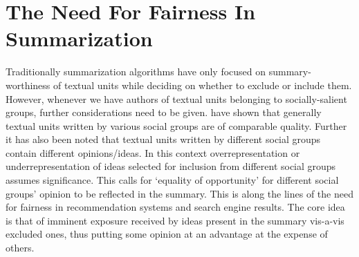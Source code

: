 \section{The Need For Fairness In Summarization}
Traditionally summarization algorithms have only focused on summary-worthiness of textual units while deciding on whether to exclude or include them. However, whenever we have authors of textual units belonging to socially-salient groups, further considerations need to be given. \cite{dash2019summarizing} have shown that generally textual units written by various social groups are of comparable quality. Further it has also been noted that textual units written by different social groups contain different opinions/ideas\cite{dash2019summarizing}. In this context overrepresentation or underrepresentation of ideas selected for inclusion from different social groups assumes significance. This calls for ‘equality of opportunity’ for different social groups’ opinion to be reflected in the summary. This is along the lines of the need for fairness in recommendation systems and search engine results. The core idea is that of imminent exposure received by ideas present in the summary vis-a-vis excluded ones, thus putting some opinion at an advantage at the expense of others.




